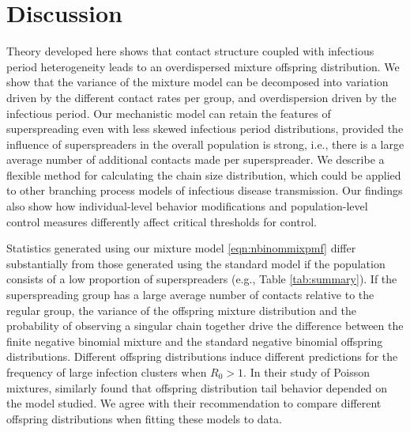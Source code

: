\documentclass{imammb}
\numberwithin{equation}{section}
\begin{document}

\section{Discussion}

Theory developed here shows that contact structure coupled with infectious period heterogeneity leads to an overdispersed mixture offspring distribution. We show that the variance of the mixture model can be decomposed into variation driven by the different contact rates per group, and overdispersion driven by the infectious period. Our mechanistic model can retain the features of superspreading even with less skewed infectious period distributions, provided the influence of superspreaders in the overall population is strong, i.e., there is a large average number of additional contacts made per superspreader. We describe a flexible method for calculating the chain size distribution, which could be applied to other branching process models of infectious disease transmission. Our findings also show how individual-level behavior modifications and population-level control measures differently affect critical thresholds for control.

Statistics generated using our mixture model \eqref{eqn:nbinommixpmf} differ substantially from those generated using the standard model if the population consists of a low proportion of superspreaders (e.g., Table \ref{tab:summary}).  If the superspreading group has a large average number of contacts relative to the regular group, the variance of the offspring mixture distribution and the probability of observing a singular chain together drive the difference between the finite negative binomial mixture and the standard negative binomial offspring distributions. Different offspring distributions induce different predictions for the frequency of large infection clusters when $R_0>1$. In their study of Poisson mixtures, \citet{Kremer2021-bi} similarly found that offspring distribution tail behavior depended on the model studied. We agree with their recommendation to compare different offspring distributions when fitting these models to data. 
\end{document}
